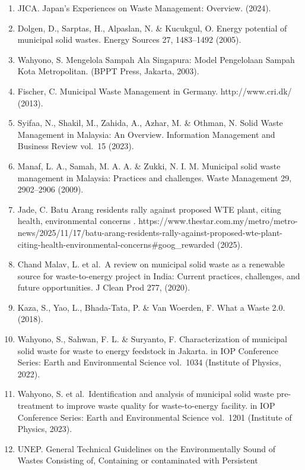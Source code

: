 \documentclass[
  letterpaper,
  DIV=11,
  numbers=noendperiod]{scrreprt}
\begin{document}
\begin{enumerate}
  Jofra Sora, M. Incineration Overcapacity and Waste Shipping in Europe:
  The End of the Proximity Principle? (2013).
\item
  JICA. Japan's Experiences on Waste Management: Overview. (2024).
\item
  Dolgen, D., Sarptas, H., Alpaslan, N. \& Kucukgul, O. Energy potential
  of municipal solid wastes. Energy Sources 27, 1483--1492 (2005).
\item
  Wahyono, S. Mengelola Sampah Ala Singapura: Model Pengelolaan Sampah
  Kota Metropolitan. (BPPT Press, Jakarta, 2003).
\item
  Fischer, C. Municipal Waste Management in Germany. http://www.cri.dk/
  (2013).
\item
  Syifaa, N., Shakil, M., Zahida, A., Azhar, M. \& Othman, N. Solid
  Waste Management in Malaysia: An Overview. Information Management and
  Business Review vol.~15 (2023).
\item
  Manaf, L. A., Samah, M. A. A. \& Zukki, N. I. M. Municipal solid waste
  management in Malaysia: Practices and challenges. Waste Management 29,
  2902--2906 (2009).
\item
  Jade, C. Batu Arang residents rally against proposed WTE plant, citing
  health, environmental concerns .
  https://www.thestar.com.my/metro/metro-news/2025/11/17/batu-arang-residents-rally-against-proposed-wte-plant-citing-health-environmental-concerns\#goog\_rewarded
  (2025).
\item
  Chand Malav, L. et al.~A review on municipal solid waste as a
  renewable source for waste-to-energy project in India: Current
  practices, challenges, and future opportunities. J Clean Prod 277,
  (2020).
\item
  Kaza, S., Yao, L., Bhada-Tata, P. \& Van Woerden, F. What a Waste 2.0.
  (2018).
\item
  Wahyono, S., Sahwan, F. L. \& Suryanto, F. Characterization of
  municipal solid waste for waste to energy feedstock in Jakarta. in IOP
  Conference Series: Earth and Environmental Science vol.~1034
  (Institute of Physics, 2022).
\item
  Wahyono, S. et al.~Identification and analysis of municipal solid
  waste pre-treatment to improve waste quality for waste-to-energy
  facility. in IOP Conference Series: Earth and Environmental Science
  vol.~1201 (Institute of Physics, 2023).
\item
  UNEP. General Technical Guidelines on the Environmentally Sound of
  Wastes Consisting of, Containing or contaminated with Persistent

\end{enumerate}
\end{document}
